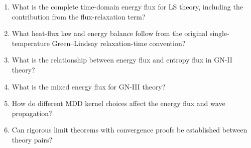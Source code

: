 \begin{enumerate}[label=\textbf{OQ4.\arabic*}]
\item What is the complete time-domain energy flux for LS theory, including the contribution from the flux-relaxation term? \\ \label{oq:4.1}
\item What heat-flux law and energy balance follow from the original single-temperature Green--Lindsay relaxation-time convention? \\ \label{oq:4.2}
\item What is the relationship between energy flux and entropy flux in GN-II theory? \\ \label{oq:4.3}
\item What is the mixed energy flux for GN-III theory? \\ \label{oq:4.4}
\item How do different MDD kernel choices affect the energy flux and wave propagation? \\ \label{oq:4.5}
\item Can rigorous limit theorems with convergence proofs be established between theory pairs? \\ \label{oq:4.6}
\end{enumerate}

